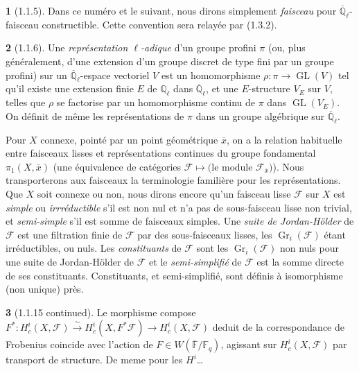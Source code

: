 \documentclass[12pt,a4paper]{article}
\theoremstyle{plain}
\theoremstyle{definition}
\theoremstyle{definition}
\newtheorem{para}{}[section]
\theoremstyle{remark}
\DeclareMathOperator{\GL}{GL}
\DeclareMathOperator{\Gr}{Gr}
\begin{document}
\begin{para}[1.1.5]
Dans ce num\'ero et le suivant, nous dirons simplement \emph{faisceau} pour $\overline{\mathbb{Q}}_\ell$-faisceau constructible. Cette convention sera relay\'ee par (1.3.2).
\end{para}

\begin{para}[1.1.6]
Une \emph{repr\'esentation $\ell$-adique} d'un groupe profini $\pi$ (ou, plus g\'en\'eralement, d'une extension d'un groupe discret de type fini par un groupe profini) sur un $\overline{\mathbb{Q}}_\ell$-espace vectoriel $V$ est un homomorphisme $\rho: \pi \to \GL(V)$ tel qu'il existe une extension finie $E$ de $\mathbb{Q}_\ell$ dans $\overline{\mathbb{Q}}_\ell$, et une $E$-structure $V_E$ sur $V$, telles que $\rho$ se factorise par un homomorphisme continu de $\pi$ dans $\GL(V_E)$. On d\'efinit de m\^eme les repr\'esentations de $\pi$ dans un groupe alg\'ebrique sur $\overline{\mathbb{Q}}_\ell$.

Pour $X$ connexe, point\'e par un point g\'eom\'etrique $\overline{x}$, on a la relation habituelle entre faisceaux lisses et repr\'esentations continues du groupe fondamental $\pi_1(X, \overline{x})$ (une \'equivalence de cat\'egories $\mathscr{F} \mapsto \text{(le module } \mathscr{F}_{\overline{x}} \text{)}$). Nous transporterons aux faisceaux la terminologie famili\`ere pour les repr\'esentations. Que $X$ soit connexe ou non, nous dirons encore qu'un faisceau lisse $\mathscr{F}$ sur $X$ est \emph{simple} ou \emph{irrr\'eductible} s'il est non nul et n'a pas de sous-faisceau lisse non trivial, et \emph{semi-simple} s'il est somme de faisceaux simples. Une \emph{suite de Jordan-H\"older} de $\mathscr{F}$ est une filtration finie de $\mathscr{F}$ par des sous-faisceaux lisses, les $\Gr_i(\mathscr{F})$ \'etant irr\'eductibles, ou nuls. Les \emph{constituants} de $\mathscr{F}$ sont les $\Gr_i(\mathscr{F})$ non nuls pour une suite de Jordan-H\"older de $\mathscr{F}$ et le \emph{semi-simplifi\'e} de $\mathscr{F}$ est la somme directe de ses constituants. Constituants, et semi-simplifi\'e, sont d\'efinis \`a isomorphisme (non unique) pr\`es.
\end{para}

\begin{para}[1.1.15 continued]
Le morphisme compose $F^*: H_c^i(X, \mathscr{F}) \xrightarrow{\sim} H_c^i(X, F^* \mathscr{F}) \to H_c^i(X, \mathscr{F})$ deduit de la correspondance de Frobenius coincide avec l'action de $F \in W(\overline{\mathbb{F}}/\mathbb{F}_q)$, agissant sur $H_c^i(X, \mathscr{F})$ par transport de structure. De meme pour les $H^i$\ldots
\end{para}
\end{document}
